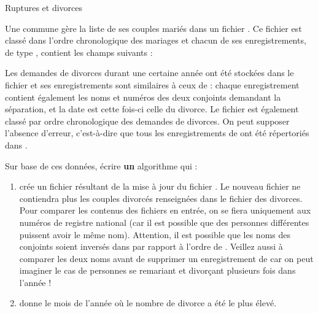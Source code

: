 \begin{Exercice}{Ruptures et divorces}

Une commune gère la liste de ses couples mariés dans un fichier .
Ce fichier est classé dans l’ordre chronologique des mariages 
et chacun de ses enregistrements, de type ,
contient les champs suivants :


Les demandes de divorces durant une certaine année 
ont été stockées dans le fichier 
et ses enregistrements sont similaires à ceux de  :
chaque enregistrement contient également les noms et numéros des deux
conjoints demandant la séparation, et la date est cette fois-ci celle
du divorce. Le fichier est également classé par ordre chronologique des
demandes de divorces. On peut supposer l’absence d’erreur, c’est-à-dire
que tous les enregistrements de 
ont été répertoriés dans .

Sur base de ces données, écrire \textbf{un} algorithme qui :

\begin{enumerate}
\item {
	crée un fichier  
	résultant de la mise à jour du fichier }. 
	Le nouveau fichier ne contiendra plus les couples divorcés 
	renseignées dans le fichier des divorces. 
	Pour comparer les contenus des fichiers en entrée, 
	on se fiera uniquement aux numéros de registre national 
	(car il est possible que des personnes différentes 
	puissent avoir le même nom). 
	Attention, il est possible que les noms des conjoints 
	soient inversés dans 
	par rapport à l’ordre de .
	Veillez aussi à comparer les deux noms 
	avant de supprimer un enregistrement de 
	car on peut imaginer le cas de personnes se remariant et divorçant
	plusieurs fois dans l’année !
\item
	donne le mois de l’année où le nombre de divorce a été le plus élevé.
\end{enumerate}

\end{Exercice}

